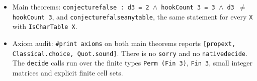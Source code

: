 \documentclass[11pt]{article}
\renewcommand{\_}{\oldus\allowbreak}
\theoremstyle{definition}
\theoremstyle{remark}
\begin{document}
\begin{itemize}
  \begin{itemize}
  \item definitions \texttt{IsUnimodularOrder}, \texttt{maxUnimodularOrder} (for rectangular
  matrices over any commutative ring) and \texttt{d3 := maxUnimodularOrder trueTable};
  \item \texttt{det\_full\_submatrix}: every $3\times3$ submatrix of $X$ has determinant $\pm6$;
  \item \texttt{unimodular\_two}, \texttt{unimodular\_le\_two}: the unimodular orders of $X$;
  \item \texttt{isUnimodularOrder\_reindex}: permuting and casting to $\mathbb C$ preserves them;
  \item \texttt{maxUnimodularOrder\_of\_isCharTable}: every character table has maximal unimodular
  order $2$; \texttt{d3\_eq\_two}.
  \end{itemize}
\item Main theorems: \texttt{conjecture\_1756\_false : d3 = 2 $\wedge$ hookCount 3 = 3 $\wedge$
d3 $\ne$ hookCount 3}, and \texttt{conjecture\_1756\_false\_any\_table}, the same statement for
every \texttt{X} with \texttt{IsCharTable X}.
\item Axiom audit: \texttt{\#print axioms} on both main theorems reports \texttt{[propext,
Classical.choice, Quot.sound]}. There is no \texttt{sorry} and no \texttt{native\_decide}. The
\texttt{decide} calls run over the finite types \texttt{Perm (Fin 3)}, \texttt{Fin 3}, small integer
matrices and explicit finite cell sets.
\end{itemize}
\end{document}
